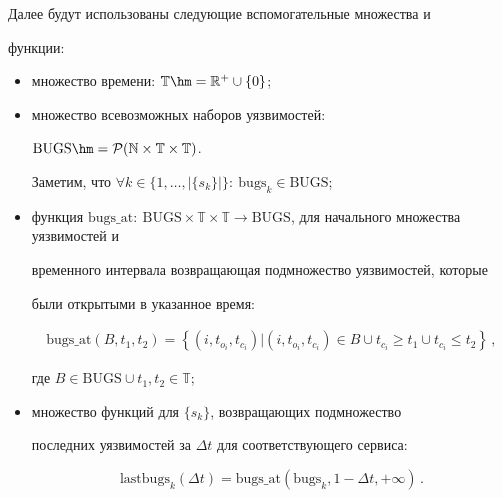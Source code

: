   


  Далее будут использованы следующие вспомогательные множества и 


функции:


  \begin{itemize}


  \item множество времени: $\mathbb{T}\hm=\mathbb{R}^+ \cup\{0\}$;


\item множество всевозможных наборов уязвимостей: 


$\mathrm{BUGS}\hm=\mathcal{P}(\mathbb{N}\times \mathbb{T}\times \mathbb{T})$. 


Заметим, что $\forall k\in \{1, \ldots ,\vert \{s_k\}\vert \}:\ \mathrm{bugs}_k\in \mathrm{BUGS}$;


\item функция $\mathrm{bugs}\_{\mathrm{at}}:\ \mathrm{BUGS}\times \mathbb{T}\times 


\mathbb{T}\rightarrow \mathrm{BUGS}$, для начального множества уязвимостей и 


временного интервала возвращающая подмножество уязвимостей, которые 


были открытыми в указанное время:


\begin{multline*}


\mathrm{bugs}\_{\mathrm{at}}\left(B,t_{1}, t_{2}\right)= \left\{


(i,t_{o_i}, t_{c_i})\vert 


(i,t_{o_i},  t_{c_{i}})\in 


B\cup t_{c_{i}}\geq t_{1} \cup t_{c_i}\leq t_2\right\}\,,


\end{multline*}


где $B\in \mathrm{BUGS} \cup t_1, t_2\in \mathbb{T}$;


\item множество функций для $\{s_k\}$, возвращающих подмножество 


последних уязвимостей за $\Delta t$ для соответствующего сервиса:


$$


\mathrm{lastbugs}_k(\Delta t) =


\mathrm{bugs}\_{\mathrm{at}}(\mathrm{bugs}_k,1-\Delta t, +\infty)\,.


$$


\end{itemize}





